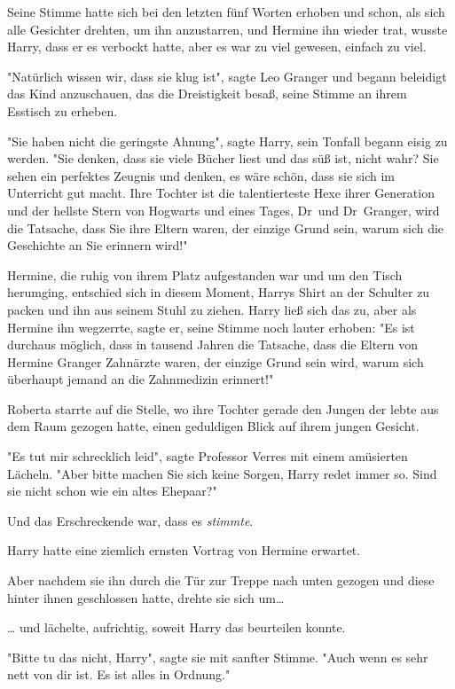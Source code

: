 {Seine Stimme hatte sich bei den letzten fünf Worten erhoben und schon, als sich alle Gesichter drehten, um ihn anzustarren, und Hermine ihn wieder trat, wusste Harry, dass er es verbockt hatte, aber es war zu viel gewesen, einfach zu viel.

"Natürlich wissen wir, dass sie klug ist", sagte Leo Granger und begann beleidigt das Kind anzuschauen, das die Dreistigkeit besaß, seine Stimme an ihrem Esstisch zu erheben.

"Sie haben nicht die geringste Ahnung", sagte Harry, sein Tonfall begann eisig zu werden. "Sie denken, dass sie viele Bücher liest und das süß ist, nicht wahr? Sie sehen ein perfektes Zeugnis und denken, es wäre schön, dass sie sich im Unterricht gut macht. Ihre Tochter ist die talentierteste Hexe ihrer Generation und der hellste Stern von Hogwarts und eines Tages, Dr~und Dr~Granger, wird die Tatsache, dass Sie ihre Eltern waren, der einzige Grund sein, warum sich die Geschichte an Sie erinnern wird!"

Hermine, die ruhig von ihrem Platz aufgestanden war und um den Tisch herumging, entschied sich in diesem Moment, Harrys Shirt an der Schulter zu packen und ihn aus seinem Stuhl zu ziehen. Harry ließ sich das zu, aber als Hermine ihn wegzerrte, sagte er, seine Stimme noch lauter erhoben: "Es ist durchaus möglich, dass in tausend Jahren die Tatsache, dass die Eltern von Hermine Granger Zahnärzte waren, der einzige Grund sein wird, warum sich überhaupt jemand an die Zahnmedizin erinnert!"

Roberta starrte auf die Stelle, wo ihre Tochter gerade den Jungen der lebte aus dem Raum gezogen hatte, einen geduldigen Blick auf ihrem jungen Gesicht.

"Es tut mir schrecklich leid", sagte Professor Verres mit einem amüsierten Lächeln. "Aber bitte machen Sie sich keine Sorgen, Harry redet immer so. Sind sie nicht schon wie ein altes Ehepaar?"

Und das Erschreckende war, dass es \emph{stimmte}.

Harry hatte eine ziemlich ernsten Vortrag von Hermine erwartet.

Aber nachdem sie ihn durch die Tür zur Treppe nach unten gezogen und diese hinter ihnen geschlossen hatte, drehte sie sich um…

… und lächelte, aufrichtig, soweit Harry das beurteilen konnte.

"Bitte tu das nicht, Harry", sagte sie mit sanfter Stimme. "Auch wenn es sehr nett von dir ist. Es ist alles in Ordnung."

}
